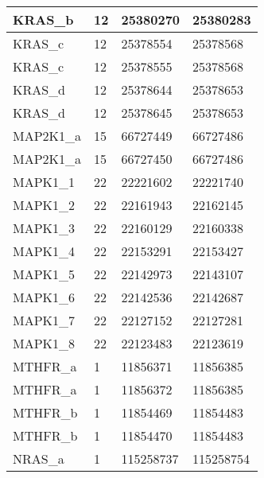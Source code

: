 \begin{longtable}{| p{} | C{.10\textwidth} | C{.35\textwidth} | C{.35\textwidth} |}
KRAS\_b                 & 12           & 25380270              & 25380283            \\ \hline
KRAS\_c                 & 12           & 25378554              & 25378568            \\ \hline
KRAS\_c                 & 12           & 25378555              & 25378568            \\ \hline
KRAS\_d                 & 12           & 25378644              & 25378653            \\ \hline
KRAS\_d                 & 12           & 25378645              & 25378653            \\ \hline
MAP2K1\_a               & 15           & 66727449              & 66727486            \\ \hline
MAP2K1\_a               & 15           & 66727450              & 66727486            \\ \hline
MAPK1\_1                & 22           & 22221602              & 22221740            \\ \hline
MAPK1\_2                & 22           & 22161943              & 22162145            \\ \hline
MAPK1\_3                & 22           & 22160129              & 22160338            \\ \hline
MAPK1\_4                & 22           & 22153291              & 22153427            \\ \hline
MAPK1\_5                & 22           & 22142973              & 22143107            \\ \hline
MAPK1\_6                & 22           & 22142536              & 22142687            \\ \hline
MAPK1\_7                & 22           & 22127152              & 22127281            \\ \hline
MAPK1\_8                & 22           & 22123483              & 22123619            \\ \hline
MTHFR\_a                & 1            & 11856371              & 11856385            \\ \hline
MTHFR\_a                & 1            & 11856372              & 11856385            \\ \hline
MTHFR\_b                & 1            & 11854469              & 11854483            \\ \hline
MTHFR\_b                & 1            & 11854470              & 11854483            \\ \hline
NRAS\_a                 & 1            & 115258737             & 115258754           \\ \hline

\end{longtable}
